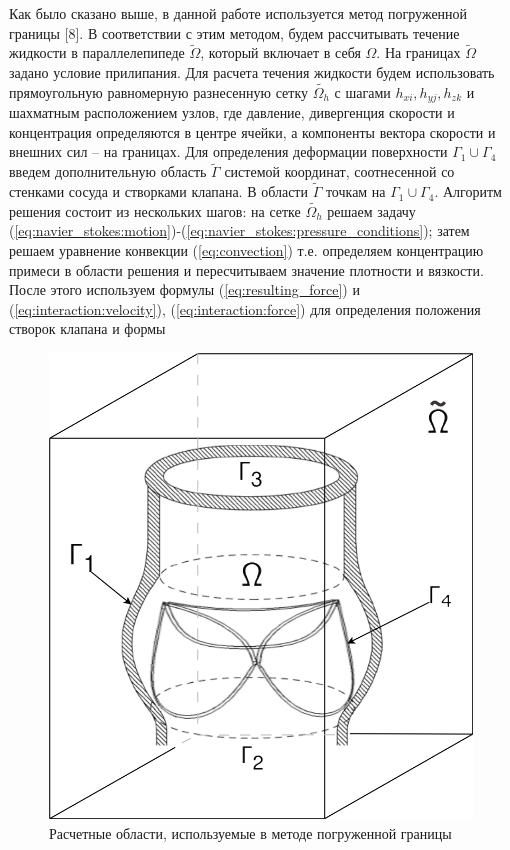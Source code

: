 Как было сказано выше, в данной работе используется метод погруженной
границы {[}8{]}. В соответствии с этим методом, будем рассчитывать
течение жидкости в параллелепипеде \(\tilde{\Omega}\), который включает
в себя \(\Omega\). На границах \(\tilde{\Omega}\) задано условие
прилипания. Для расчета течения жидкости будем использовать
прямоугольную равномерную разнесенную сетку \(\tilde{\Omega_h}\) с
шагами \(h_{xi}, h_{yj}, h_{zk}\) и шахматным расположением узлов, где
давление, дивергенция скорости и концентрация определяются в центре
ячейки, а компоненты вектора скорости и внешних сил -- на границах. Для
определения деформации поверхности \(\Gamma_1 \cup \Gamma_4\) введем
дополнительную область \(\tilde{\Gamma}\) системой координат,
соотнесенной со стенками сосуда и створками клапана. В области
\(\tilde{\Gamma}\) точкам на \(\Gamma_1 \cup \Gamma_4\). Алгоритм
решения состоит из нескольких шагов: на сетке \(\tilde{\Omega_h}\)
решаем задачу
(\ref{eq:navier_stokes:motion})-(\ref{eq:navier_stokes:pressure_conditions});
затем решаем уравнение конвекции (\ref{eq:convection}) т.е. определяем
концентрацию примеси в области решения и пересчитываем значение
плотности и вязкости. После этого используем формулы
(\ref{eq:resulting_force}) и (\ref{eq:interaction:velocity}),
(\ref{eq:interaction:force}) для определения положения створок клапана и
формы

\begin{figure}[htbp]
\centering
\includegraphics{aorta_valve_computation_scheme.png}
\caption{\label{fig:aorta_valve_computation_scheme}Расчетные области,
используемые в методе погруженной границы}
\end{figure}

